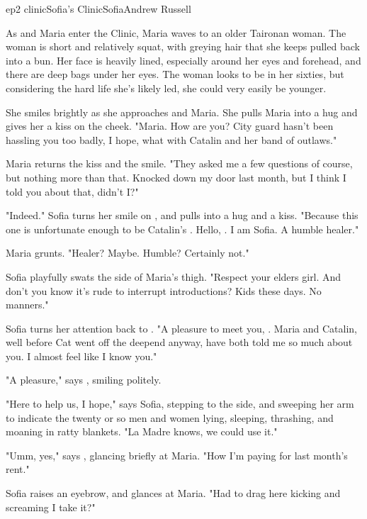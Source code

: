 \documentclass{book}
\begin{document}
\begin{node}{ep2 clinic}{Sofia's Clinic}{Sofia}{Andrew Russell}

    As \name{} and Maria enter the Clinic, Maria waves to an older Taironan woman. The woman is short and relatively squat, with greying hair that she keeps pulled back into a bun. Her face is heavily lined, especially around her eyes and forehead, and there are 
    deep bags under her eyes. The woman looks to be in her sixties, but considering the hard life she's likely led, she could very easily be younger. 

    She smiles brightly as she approaches \name{} and Maria. She pulls Maria into a hug and gives her a kiss on the cheek. "Maria. How are you? City guard hasn't been hassling you too badly, I hope, what with Catalin and her band of outlaws."

    Maria returns the kiss and the smile. "They asked me a few questions of course, but nothing more than that. Knocked down my door last month, but I think I told you about that, didn't I?"

    "Indeed." Sofia turns her smile on \name{}, and pulls \himher{} into a hug and a kiss. "Because this one is unfortunate enough to be Catalin's \brothersister{}. Hello, \name{}. I am Sofia. A humble healer."

    Maria grunts. "Healer? Maybe. Humble? Certainly not."

    Sofia playfully swats the side of Maria's thigh. "Respect your elders girl. And don't you know it's rude to interrupt introductions? Kids these days. No manners." 

    Sofia turns her attention back to \name{}. "A pleasure to meet you, \name{}. Maria and Catalin, well before Cat went off the deepend anyway, have both told me so much about you. I almost feel like I know you."

    "A pleasure," says \name{}, smiling politely. 

    "Here to help us, I hope," says Sofia, stepping to the side, and sweeping her arm to indicate the twenty or so men and women lying, sleeping, thrashing, and moaning in ratty blankets. "La Madre knows, we could use it."

    "Umm, yes," says \name{}, glancing briefly at Maria. "How I'm paying for last month's rent."

    Sofia raises an eyebrow, and glances at Maria. "Had to drag \himher{} here kicking and screaming I take it?"


\end{node}
\end{document}
